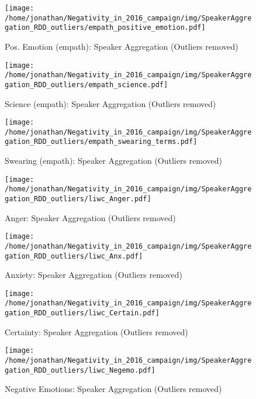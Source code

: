 \begin{figure}[h]\centering
	\texttt{[image: /home/jonathan/Negativity\_in\_2016\_campaign/img/SpeakerAggregation\_RDD\_outliers/empath\_positive\_emotion.pdf]}
	\caption{Pos. Emotion (empath): Speaker Aggregation (Outliers removed)}
	\label{fig: sa_Pos. Emotion (empath)}
\end{figure}

\begin{figure}[h]\centering
	\texttt{[image: /home/jonathan/Negativity\_in\_2016\_campaign/img/SpeakerAggregation\_RDD\_outliers/empath\_science.pdf]}
	\caption{Science (empath): Speaker Aggregation (Outliers removed)}
	\label{fig: sa_Science (empath)}
\end{figure}

\begin{figure}[h]\centering
	\texttt{[image: /home/jonathan/Negativity\_in\_2016\_campaign/img/SpeakerAggregation\_RDD\_outliers/empath\_swearing\_terms.pdf]}
	\caption{Swearing (empath): Speaker Aggregation (Outliers removed)}
	\label{fig: sa_Swearing (empath)}
\end{figure}

\begin{figure}[h]\centering
	\texttt{[image: /home/jonathan/Negativity\_in\_2016\_campaign/img/SpeakerAggregation\_RDD\_outliers/liwc\_Anger.pdf]}
	\caption{Anger: Speaker Aggregation (Outliers removed)}
	\label{fig: sa_Anger}
\end{figure}

\begin{figure}[h]\centering
	\texttt{[image: /home/jonathan/Negativity\_in\_2016\_campaign/img/SpeakerAggregation\_RDD\_outliers/liwc\_Anx.pdf]}
	\caption{Anxiety: Speaker Aggregation (Outliers removed)}
	\label{fig: sa_Anxiety}
\end{figure}

\begin{figure}[h]\centering
	\texttt{[image: /home/jonathan/Negativity\_in\_2016\_campaign/img/SpeakerAggregation\_RDD\_outliers/liwc\_Certain.pdf]}
	\caption{Certainty: Speaker Aggregation (Outliers removed)}
	\label{fig: sa_Certainty}
\end{figure}

\begin{figure}[h]\centering
	\texttt{[image: /home/jonathan/Negativity\_in\_2016\_campaign/img/SpeakerAggregation\_RDD\_outliers/liwc\_Negemo.pdf]}
	\caption{Negative Emotions: Speaker Aggregation (Outliers removed)}
	\label{fig: sa_Negative Emotions}
\end{figure}

